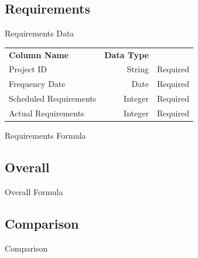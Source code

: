     \subsection{Requirements}
        \begin{frame}{Requirements Data}
            \centering
            \begin{tabular}{l | r | r}
                {\bfseries Column Name}
                 & {\bfseries Data Type}
                 &  \\
                
                Project ID & String  & Required \\
                \myrowcolour%
                Frequency Date & Date & Required \\
                Scheduled Requirements & Integer & Required \\
                \myrowcolour%
                Actual Requirements & Integer  & Required \\
            \end{tabular}
        \end{frame} 
        \begin{frame}{Requirements Formula }
        \end{frame} 
    \subsection{Overall}
        \begin{frame}{Overall Formula}
        \end{frame} 

    \subsection{Comparison}
        \begin{frame}{Comparison}
        \end{frame} 
    
